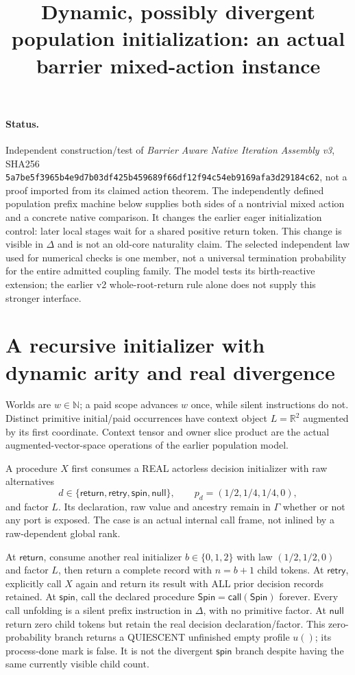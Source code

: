 \documentclass{article}
\title{Dynamic, possibly divergent population initialization: an actual barrier mixed-action instance}
\begin{document}
\maketitle
\paragraph{Status.} Independent construction/test of \emph{Barrier Aware Native Iteration Assembly v3}, SHA256 \texttt{5a7be5f3965b4e9d7b03df425b459689f66df12f94c54eb9169afa3d29184c62}, not a proof imported from its claimed action theorem. The independently defined population prefix machine below supplies both sides of a nontrivial mixed action and a concrete native comparison. It changes the earlier eager initialization control: later local stages wait for a shared positive return token. This change is visible in $\Delta$ and is not an old-core naturality claim. The selected independent law used for numerical checks is one member, not a universal termination probability for the entire admitted coupling family. The model tests its birth-reactive extension; the earlier v2 whole-root-return rule alone does not supply this stronger interface.

\section{A recursive initializer with dynamic arity and real divergence}
Worlds are $w\in\mathbb N$; a paid scope advances $w$ once, while silent instructions do not. Distinct primitive initial/paid occurrences have context object $L=\mathbb R^2$ augmented by its first coordinate. Context tensor and owner slice product are the actual augmented-vector-space operations of the earlier population model.

A procedure $X$ first consumes a REAL actorless decision initializer with raw alternatives
\[
 d\in\{\mathsf{return},\mathsf{retry},\mathsf{spin},\mathsf{null}\},
 \qquad p_d=(1/2,1/4,1/4,0),
\]
and factor $L$. Its declaration, raw value and ancestry remain in $\Gamma$ whether or not any port is exposed. The case is an actual internal call frame, not inlined by a raw-dependent global rank.

At $\mathsf{return}$, consume another real initializer $b\in\{0,1,2\}$ with law $(1/2,1/2,0)$ and factor $L$, then return a complete record with $n=b+1$ child tokens. At $\mathsf{retry}$, explicitly call $X$ again and return its result with ALL prior decision records retained. At $\mathsf{spin}$, call the declared procedure $\mathsf{Spin}=\mathsf{call}(\mathsf{Spin})$ forever. Every call unfolding is a silent prefix instruction in $\Delta$, with no primitive factor. At $\mathsf{null}$ return zero child tokens but retain the real decision declaration/factor. This zero-probability branch returns a QUIESCENT unfinished empty profile $u()$; its process-done mark is false. It is not the divergent $\mathsf{spin}$ branch despite having the same currently visible child count.
\end{document}
